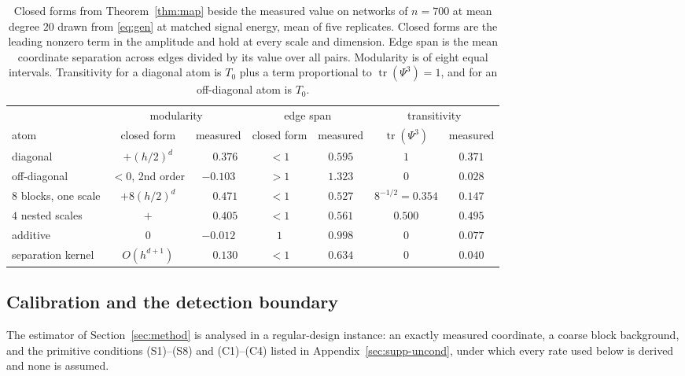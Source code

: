\documentclass[11pt]{article}
\theoremstyle{definition}
\newcommand{\1}{\mathbf 1}\newcommand{\op}{\operatorname}
\begin{document}
\begin{table}[t]\centering
\caption{Closed forms from Theorem~\ref{thm:map} beside the measured value on
networks of $n=700$ at mean degree $20$ drawn from \eqref{eq:gen} at matched
signal energy, mean of five replicates.  Closed forms are the leading nonzero
term in the amplitude and hold at every scale and dimension.  Edge span is the
mean coordinate separation across edges divided by its value over all pairs.
Modularity is of eight equal intervals.  Transitivity for a diagonal atom is
$T_0$ plus a term proportional to $\operatorname{tr}(\Psi^3)=1$, and for an
off-diagonal atom is $T_0$.}
\label{tab:map}
\begin{tabular}{lcccccc}
\hline
 & \multicolumn{2}{c}{modularity} & \multicolumn{2}{c}{edge span} & \multicolumn{2}{c}{transitivity}\\
atom & closed form & measured & closed form & measured & $\operatorname{tr}(\Psi^3)$ & measured\\
\hline
diagonal              & $+(h/2)^{d}$ & $\phantom{-}0.376$ & $<1$ & $0.595$ & $1$ & $0.371$\\
off-diagonal          & $<0$, 2nd order & $-0.103$ & $>1$ & $1.323$ & $0$ & $0.028$\\
$8$ blocks, one scale & $+8(h/2)^{d}$ & $\phantom{-}0.471$ & $<1$ & $0.527$ & $8^{-1/2}=0.354$ & $0.147$\\
$4$ nested scales     & $+$ & $\phantom{-}0.405$ & $<1$ & $0.561$ & $0.500$ & $0.495$\\
additive              & $0$ & $-0.012$ & $1$ & $0.998$ & $0$ & $0.077$\\
separation kernel     & $O(h^{d+1})$ & $\phantom{-}0.130$ & $<1$ & $0.634$ & $0$ & $0.040$\\
\hline
\end{tabular}
\end{table}

\subsection{Calibration and the detection boundary}      \label{sec:thy-inf}

The estimator of Section~\ref{sec:method} is analysed in a regular-design
instance: an exactly measured coordinate, a coarse block background, and the
primitive conditions \textup{(S1)--(S8)} and \textup{(C1)--(C4)} listed in
Appendix~\ref{sec:supp-uncond}, under which every rate used below is derived
and none is assumed.
\end{document}
